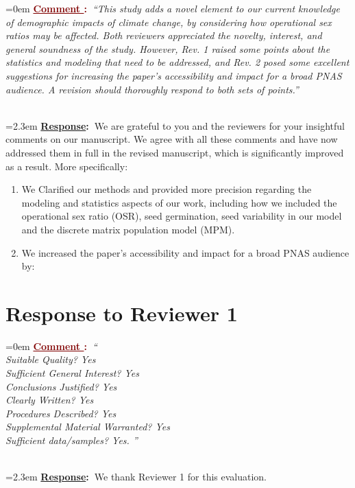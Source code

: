 \documentclass[12pt]{article}
\newcounter{cN}
\newcommand{\comment}[1]{
	\vspace{2em}
	\refstepcounter{cN} %
	\noindent \hangindent=0em \textbf{\textcolor{Maroon}{\uline{Comment \thecN}:~}}\emph{``#1''}
	}
\newcommand{\response}[1]{
	\\[0.25em]
	\hangindent=2.3em \textbf{\textcolor{NavyBlue}{\uline{Response}:~}}#1
	}
\begin{document}
\comment{This study adds a novel element to our current knowledge of demographic impacts of climate change, by considering how operational sex ratios may be affected. Both reviewers appreciated the novelty, interest, and general soundness of the study. However, Rev. 1 raised some points about the statistics and modeling that need to be addressed, and Rev. 2 posed some excellent suggestions for increasing the paper's accessibility and impact for a broad PNAS audience. A revision should thoroughly respond to both sets of points.}
\response{We are grateful to you and the reviewers for your insightful comments on our manuscript. 
We agree with all these comments and have now addressed them in full in the revised manuscript, which is significantly improved as a result. 
More   specifically:
\begin{enumerate}
	\item We Clarified our methods and provided more precision regarding the modeling and statistics aspects of our work, including how we included the operational sex ratio (OSR), seed germination, seed variability in our model and the discrete matrix population model (MPM).
	\item We increased the paper’s accessibility and impact for a broad PNAS audience by: 
\end{enumerate}
}

\section{Response to Reviewer 1}
\vspace{-2em}

\comment{
\\
Suitable Quality? Yes
\\
Sufficient General Interest? Yes
\\
Conclusions Justified? Yes
\\
Clearly Written? Yes
\\
Procedures Described? Yes
\\
Supplemental Material Warranted? Yes
\\
Sufficient data/samples? Yes.
}
\response{We thank Reviewer 1 for this  evaluation.}
\end{document}
